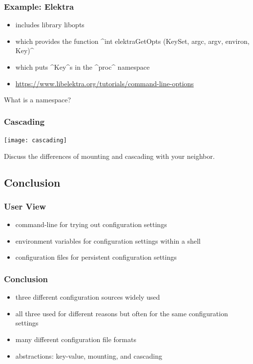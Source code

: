 \begin{frame}[fragile]
	\frametitle{Example: Elektra}

	\begin{itemize}
	\item includes library libopts
	\item which provides the function ^int elektraGetOpts (KeySet, argc, argv, environ, Key)^
	\item which puts ^Key^s in the ^proc^ namespace
	\item \url{https://www.libelektra.org/tutorials/command-line-options}
	\end{itemize}

	\pause
	\vspace{1cm}

	What is a namespace?
\end{frame}

\begin{frame}
	\frametitle{Cascading}
	\texttt{[image: cascading]}
\end{frame}

\begin{assignment}
	\begin{task}
	Discuss the differences of mounting and cascading with your neighbor.
	\end{task}
\end{assignment}


\subsection{Conclusion}

\begin{frame}
	\frametitle{User View}
	\begin{itemize}
	\item command-line for trying out configuration settings
	\item environment variables for configuration settings within a shell
	\item configuration files for persistent configuration settings
	\end{itemize}
\end{frame}

\begin{frame}
	\frametitle{Conclusion}
	\begin{itemize}
	\item three different configuration sources widely used
	\item all three used for different reasons but often for the same configuration settings
	\item many different configuration file formats
	\item abstractions: key-value, mounting, and cascading
	\end{itemize}
\end{frame}






